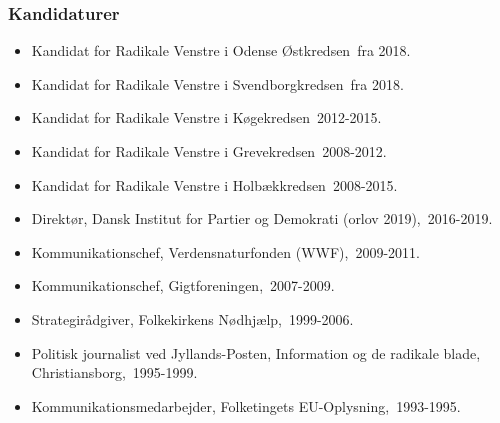 \documentclass[11pt, a4paper]{awesome-cv}
\begin{document}
\begin{cvletter}
\subsubsection*{Kandidaturer}
\begin{itemize}
\item Kandidat for Radikale Venstre i Odense Østkredsen fra 2018.
\item Kandidat for Radikale Venstre i Svendborgkredsen fra 2018.
\item Kandidat for Radikale Venstre i Køgekredsen 2012-2015.
\item Kandidat for Radikale Venstre i Grevekredsen 2008-2012.
\item Kandidat for Radikale Venstre i Holbækkredsen 2008-2015.
\end{itemize}
\begin{itemize}
\item Direktør, Dansk Institut for Partier og Demokrati (orlov 2019), 2016-2019.
\item Kommunikationschef, Verdensnaturfonden (WWF), 2009-2011.
\item Kommunikationschef, Gigtforeningen, 2007-2009.
\item Strategirådgiver, Folkekirkens Nødhjælp, 1999-2006.
\item Politisk journalist ved Jyllands-Posten, Information og de radikale blade, Christiansborg, 1995-1999.
\item Kommunikationsmedarbejder, Folketingets EU-Oplysning, 1993-1995.
\end{itemize}
\end{cvletter}
\end{document}
